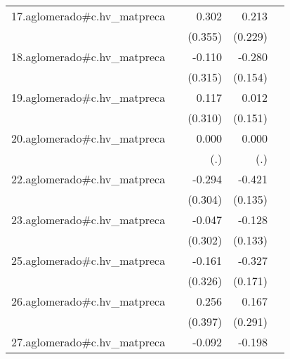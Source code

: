 {\begin{longtable}{l*{4}{D{.}{.}{-1}}}
\addlinespace
17.aglomerado#c.hv\_matpreca&                     &       0.302         &       0.213         &                     \\
            &                     &     (0.355)         &     (0.229)         &                     \\
\addlinespace
18.aglomerado#c.hv\_matpreca&                     &      -0.110         &      -0.280         &                     \\
            &                     &     (0.315)         &     (0.154)         &                     \\
\addlinespace
19.aglomerado#c.hv\_matpreca&                     &       0.117         &       0.012         &                     \\
            &                     &     (0.310)         &     (0.151)         &                     \\
\addlinespace
20.aglomerado#c.hv\_matpreca&                     &       0.000         &       0.000         &                     \\
            &                     &         (.)         &         (.)         &                     \\
\addlinespace
22.aglomerado#c.hv\_matpreca&                     &      -0.294         &      -0.421\sym{**} &                     \\
            &                     &     (0.304)         &     (0.135)         &                     \\
\addlinespace
23.aglomerado#c.hv\_matpreca&                     &      -0.047         &      -0.128         &                     \\
            &                     &     (0.302)         &     (0.133)         &                     \\
\addlinespace
25.aglomerado#c.hv\_matpreca&                     &      -0.161         &      -0.327         &                     \\
            &                     &     (0.326)         &     (0.171)         &                     \\
\addlinespace
26.aglomerado#c.hv\_matpreca&                     &       0.256         &       0.167         &                     \\
            &                     &     (0.397)         &     (0.291)         &                     \\
\addlinespace
27.aglomerado#c.hv\_matpreca&                     &      -0.092         &      -0.198\sym{**} &                     \\

\end{longtable}}
